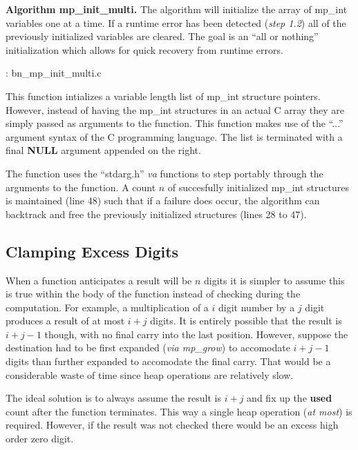 \documentclass[b5paper]{book}
\begin{document}
\textbf{Algorithm mp\_init\_multi.}
The algorithm will initialize the array of mp\_int variables one at a time.  If a runtime error has been detected 
(\textit{step 1.2}) all of the previously initialized variables are cleared.  The goal is an ``all or nothing'' 
initialization which allows for quick recovery from runtime errors.

\vspace{+3mm}\begin{small}
\hspace{-5.1mm}{\bf File}: bn\_mp\_init\_multi.c
\vspace{-3mm}
\begin{alltt}
\end{alltt}
\end{small}

This function intializes a variable length list of mp\_int structure pointers.  However, instead of having the mp\_int
structures in an actual C array they are simply passed as arguments to the function.  This function makes use of the 
``...'' argument syntax of the C programming language.  The list is terminated with a final \textbf{NULL} argument 
appended on the right.  

The function uses the ``stdarg.h'' \textit{va} functions to step portably through the arguments to the function.  A count
$n$ of succesfully initialized mp\_int structures is maintained (line 48) such that if a failure does occur,
the algorithm can backtrack and free the previously initialized structures (lines 28 to 47).  


\subsection{Clamping Excess Digits}
When a function anticipates a result will be $n$ digits it is simpler to assume this is true within the body of 
the function instead of checking during the computation.  For example, a multiplication of a $i$ digit number by a 
$j$ digit produces a result of at most $i + j$ digits.  It is entirely possible that the result is $i + j - 1$ 
though, with no final carry into the last position.  However, suppose the destination had to be first expanded 
(\textit{via mp\_grow}) to accomodate $i + j - 1$ digits than further expanded to accomodate the final carry.  
That would be a considerable waste of time since heap operations are relatively slow.

The ideal solution is to always assume the result is $i + j$ and fix up the \textbf{used} count after the function
terminates.  This way a single heap operation (\textit{at most}) is required.  However, if the result was not checked
there would be an excess high order zero digit.  
\end{document}
